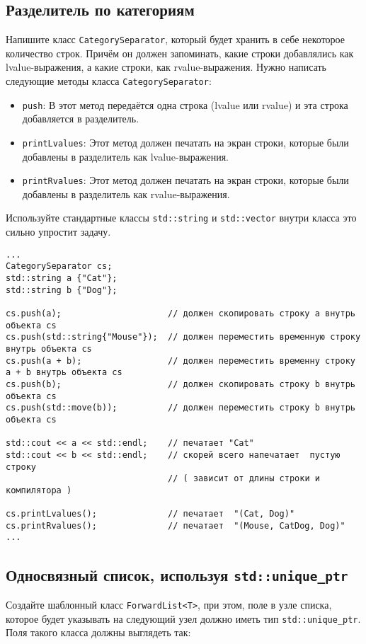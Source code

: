 \documentclass{article}
\begin{document}
\newpage
\subsection{Разделитель по категориям}
Напишите класс \texttt{CategorySeparator}, который будет хранить в себе некоторое количество строк.
Причём он должен запоминать, какие строки добавлялись как lvalue-выражения, а какие строки, как rvalue-выражения. Нужно написать следующие методы класса \texttt{CategorySeparator}:

\begin{itemize}
\item \texttt{push}: В этот метод передаётся одна строка (lvalue или rvalue) и эта строка добавляется в разделитель.
\item \texttt{printLvalues}: Этот метод должен печатать на экран строки, которые были добавлены в разделитель как lvalue-выражения.
\item \texttt{printRvalues}: Этот метод должен печатать на экран строки, которые были добавлены в разделитель как rvalue-выражения.
\end{itemize}

Используйте стандартные классы \texttt{std::string} и \texttt{std::vector} внутри класса это сильно упростит задачу.
\begin{lstlisting}
...
CategorySeparator cs;
std::string a {"Cat"};
std::string b {"Dog"};

cs.push(a);                     // должен скопировать строку a внутрь объекта cs
cs.push(std::string{"Mouse"});  // должен переместить временную строку внутрь объекта cs
cs.push(a + b);                 // должен переместить временну строку a + b внутрь объекта cs
cs.push(b);                     // должен скопировать строку b внутрь объекта cs
cs.push(std::move(b)); 	        // должен переместить строку b внутрь объекта cs

std::cout << a << std::endl;    // печатает "Cat"
std::cout << b << std::endl;    // скорей всего напечатает  пустую строку 
                                // ( зависит от длины строки и компилятора )

cs.printLvalues();              // печатает  "(Cat, Dog)"
cs.printRvalues();              // печатает  "(Mouse, CatDog, Dog)"
...
\end{lstlisting}



\newpage
\subsection{Односвязный список, используя \texttt{std::unique\_ptr}}
Создайте шаблонный класс \texttt{ForwardList<T>}, при этом, поле в узле списка, которое будет указывать на следующий узел должно иметь тип \texttt{std::unique\_ptr}. Поля такого класса должны выглядеть так:
\end{document}
